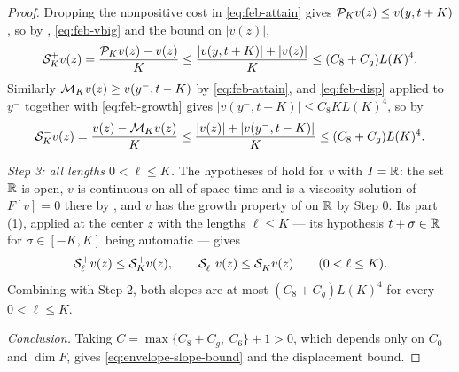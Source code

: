 \begin{proof}
Dropping the nonpositive cost in \eqref{eq:feb-attain} gives
$\mathcal{P}_Kv(z)\le v(y,t+K)$, so by , \eqref{eq:feb-vbig} and
the bound on $|v(z)|$,
\[
  \mathcal{S}_K^+v(z)=\frac{\mathcal{P}_Kv(z)-v(z)}{K}
   \le\frac{|v(y,t+K)|+|v(z)|}{K}\le(C_8+C_g)L(K)^4 .
\]
Similarly $\mathcal{M}_Kv(z)\ge v(y^-,t-K)$ by \eqref{eq:feb-attain}, and
\eqref{eq:feb-disp} applied to $y^-$ together with \eqref{eq:feb-growth} gives
$|v(y^-,t-K)|\le C_8KL(K)^4$, so by 
\[
  \mathcal{S}_K^-v(z)=\frac{v(z)-\mathcal{M}_Kv(z)}{K}
   \le\frac{|v(z)|+|v(y^-,t-K)|}{K}\le(C_8+C_g)L(K)^4 .
\]

\emph{Step 3: all lengths $0<\ell\le K$.}
The hypotheses of  hold for $v$ with $I=\mathbb{R}$: the
set $\mathbb{R}$ is open, $v$ is continuous on all of space-time and is a viscosity
solution of $F[v]=0$ there by , and $v$ has the growth
property of  on $\mathbb{R}$ by Step 0. Its part (1),
applied at the center $z$ with the lengths $\ell\le K$ — its hypothesis
$t+\sigma\in\mathbb{R}$ for $\sigma\in[-K,K]$ being automatic — gives
\[
  \mathcal{S}_\ell^+v(z)\le\mathcal{S}_K^+v(z),\qquad
  \mathcal{S}_\ell^-v(z)\le\mathcal{S}_K^-v(z)\qquad(0<\ell\le K).
\]
Combining with Step 2, both slopes are at most $(C_8+C_g)L(K)^4$ for every
$0<\ell\le K$.

\emph{Conclusion.} Taking $C=\max\{C_8+C_g,\ C_6\}+1>0$, which depends only on
$C_0$ and $\dim F$, gives \eqref{eq:envelope-slope-bound} and the displacement
bound.
\end{proof}
